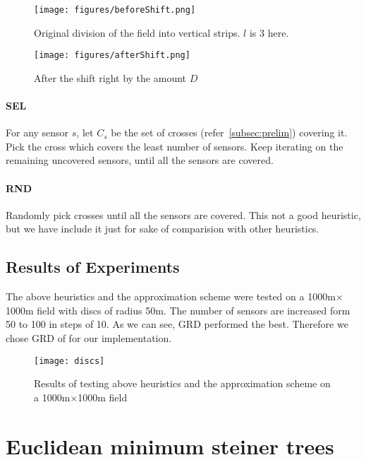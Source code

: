 \begin{figure}[H]

\texttt{[image: figures/beforeShift.png]}
\caption{Original division of the field into vertical strips. $l$ is 3 here.} \label{fig:origStrip}

\end{figure}

\begin{figure}[H]

\texttt{[image: figures/afterShift.png]}

\caption{After the shift right by the amount $D$}\label{fig:shiftStrip}

\end{figure}

\paragraph*{SEL} 
  
For any sensor $s$, let $C_s$ be the set of crosses 
(refer~\ref{subsec:prelim}) covering it. Pick the cross which covers the 
least number of sensors. Keep iterating on the remaining uncovered sensors, until all the sensors are covered.

\paragraph*{RND} Randomly pick crosses until all the sensors are covered. This not a good heuristic, but we have include it just for sake of comparision with other heuristics.

\subsection{Results of Experiments}

The above heuristics and the approximation scheme were tested on a 1000m$\times$1000m field with discs of radius 50m. The number of sensors are increased form 50 to 100 in steps of 10. As we can see, GRD performed the best. Therefore we chose GRD of for our implementation.

\begin{figure}[H]
\texttt{[image: discs]}
\caption{Results of testing above heuristics and the approximation scheme on a 1000m$\times$1000m field}\label{fig:discResults}
\end{figure}

\section{Euclidean minimum steiner trees}\label{sec:steinerPoints}

